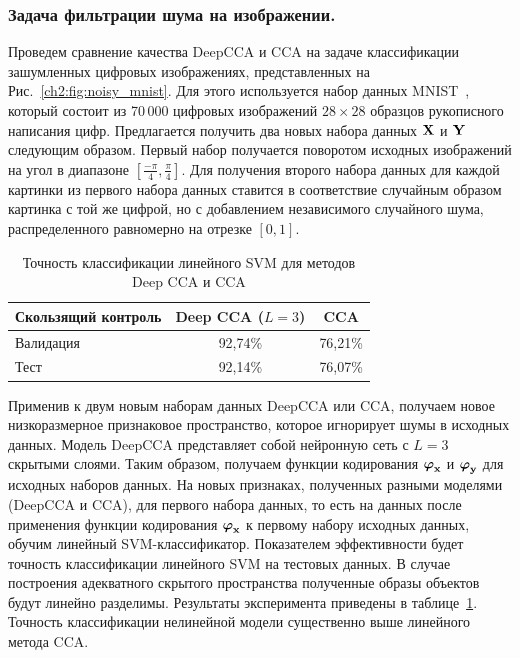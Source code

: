\subsubsection{Задача фильтрации шума на изображении.}
Проведем сравнение качества DeepCCA и CCA на задаче классификации зашумленных цифровых изображениях, представленных на Рис.~\ref{ch2:fig:noisy_mnist}. Для этого используется набор данных MNIST~\cite{MNIST}, который состоит из 70\,000 цифровых изображений $28 \times 28$ образцов рукописного написания цифр. Предлагается получить два новых набора данных $\mathbf{X}$ и $\mathbf{Y}$ следующим образом. Первый набор получается поворотом исходных изображений на угол в диапазоне $[\frac{-\pi}{4}, \frac{\pi}{4}]$. Для получения второго набора данных для каждой картинки из первого набора данных ставится в соответствие случайным образом картинка с той же цифрой, но с добавлением независимого случайного шума, распределенного равномерно на отрезке $[0,1]$.

\begin{table}[ht]
	\caption{Точность классификации линейного SVM для методов Deep CCA и CCA}
	\centering
	\begin{tabular}{l|cc}
	\hline
		Скользящий контроль & Deep CCA ($L=3$) & CCA \\  \hline
		Валидация & 92,74\%  &  76,21\%\\
		Тест & 92,14\% & 76,07\% \\
		\hline
	\end{tabular}
	\label{ch2:tbl:svm_cca}
\end{table}

Применив к двум новым наборам данных DeepCCA или CCA, получаем новое низкоразмерное признаковое пространство, которое игнорирует шумы в исходных данных. Модель DeepCCA представляет собой нейронную сеть с $L=3$ скрытыми слоями. Таким образом, получаем функции кодирования $\boldsymbol{\varphi}_{\mathbf{x}}$ и $\boldsymbol{\varphi}_{\mathbf{y}}$ для исходных наборов данных. На новых признаках, полученных разными моделями (DeepCCA и CCA), для первого набора данных, то есть на данных после применения функции кодирования $\boldsymbol{\varphi}_{\mathbf{x}}$ к первому набору исходных данных, обучим линейный SVM-классификатор. Показателем эффективности будет точность классификации линейного SVM на тестовых данных. В случае построения адекватного скрытого пространства полученные образы объектов будут линейно разделимы. Результаты эксперимента приведены в таблице~\ref{ch2:tbl:svm_cca}. Точность классификации нелинейной модели существенно выше линейного метода CCA.

